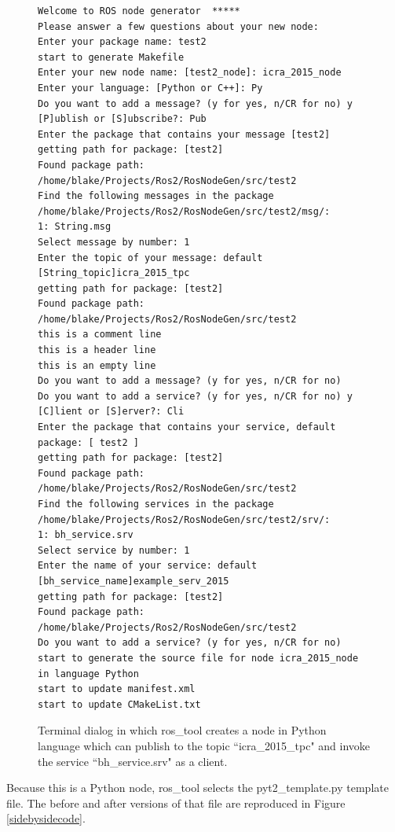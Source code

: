 \documentclass[letterpaper, 10 pt, conference]{ieeeconf}  %
\begin{document}
\begin{figure}
{\small
\begin{verbatim}
Welcome to ROS node generator  *****
Please answer a few questions about your new node:
Enter your package name: test2
start to generate Makefile
Enter your new node name: [test2_node]: icra_2015_node
Enter your language: [Python or C++]: Py
Do you want to add a message? (y for yes, n/CR for no) y
[P]ublish or [S]ubscribe?: Pub
Enter the package that contains your message [test2]
getting path for package: [test2]
Found package path: /home/blake/Projects/Ros2/RosNodeGen/src/test2
Find the following messages in the package /home/blake/Projects/Ros2/RosNodeGen/src/test2/msg/:
1: String.msg
Select message by number: 1
Enter the topic of your message: default [String_topic]icra_2015_tpc
getting path for package: [test2]
Found package path: /home/blake/Projects/Ros2/RosNodeGen/src/test2
this is a comment line
this is a header line
this is an empty line
Do you want to add a message? (y for yes, n/CR for no) 
Do you want to add a service? (y for yes, n/CR for no) y
[C]lient or [S]erver?: Cli
Enter the package that contains your service, default package: [ test2 ]
getting path for package: [test2]
Found package path: /home/blake/Projects/Ros2/RosNodeGen/src/test2
Find the following services in the package /home/blake/Projects/Ros2/RosNodeGen/src/test2/srv/:
1: bh_service.srv
Select service by number: 1
Enter the name of your service: default [bh_service_name]example_serv_2015
getting path for package: [test2]
Found package path: /home/blake/Projects/Ros2/RosNodeGen/src/test2
Do you want to add a service? (y for yes, n/CR for no) 
start to generate the source file for node icra_2015_node in language Python
start to update manifest.xml
start to update CMakeList.txt
\end{verbatim}
}
\caption{Terminal dialog in which ros\_tool creates a node in Python language which can publish to the topic ``icra\_2015\_tpc" and invoke the service ``bh\_service.srv" as a client.}\label{dialogexample}
\end{figure}

Because this is a Python node, ros\_tool selects  the pyt2\_template.py template file.  The before and after versions of that file are reproduced in Figure \ref{sidebysidecode}.
\end{document}
